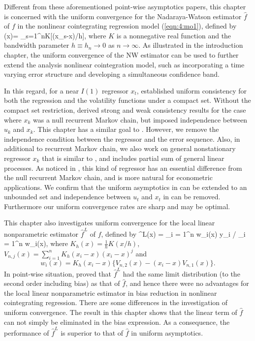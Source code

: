 Different from these aforementioned point-wise asymptotics papers, this chapter is concerned with the uniform convergence for the Nadaraya-Watson estimator $\widehat{f}$ of $f$ in the nonlinear cointegrating
regression model (\ref {eqn:4:mo1}), defined by
\be {}(x)=
{\sum_{s=1}^{n}K[(x_{s}-x)/h]},
\ee
where $K$ is a nonnegative real function and  the bandwidth parameter $h\equiv h_n\to 0$ as $n\to\infty$. As illustrated in the introduction chapter, the uniform convergence of the NW estimator can be used to further extend the analysis nonlinear cointegration model, such as incorporating a time varying error structure and developing a simultaneous confidence band.

In this regard, for a near $I(1)$ regressor $x_t$, \cite{wangwang2012} established uniform consistency for  both the regression and the volatility functions under  a compact set. Without the compact set restriction,  \cite{gaolitjostheim2011} derived strong and weak consistency results for the case where $x_k$ was a null recurrent Markov chain,  but  imposed  independence between $u_k$ and $x_k$. This chapter has a similar goal to \cite{gaolitjostheim2011}. However, we remove the independence condition between the regressor and the error sequence. Also, in additional to recurrent Markov chain, we also work on general nonstationary regressor $x_k$ that is similar to \cite{wangphillips2010a}, and includes partial sum of general linear processes. As noticed in \cite{wangphillips2010a}, this kind of regressor has an essential difference from the null recurrent Markov chain, and is more natural for econometric applications.  We confirm that the uniform asymptotics in \cite{wangwang2012} can be extended to an unbounded set and independence between $u_t$ and $x_t$ in \cite{gaolitjostheim2011} can be removed. Furthermore  our uniform convergence rates are sharp and may be optimal.

This chapter also investigates uniform convergence for the local linear nonparametric estimator $\widehat{f}^L$ of $f$, defined by
\be {}
^L(x) = \sum_{i = 1}^n w_i(x) y_i / \sum_{i = 1}^n w_i(x), \quad
\ee
where $K_h(x) = \frac{1}{h}K(x/h)$, $V_{n, j}(x) =  \sum_{i=1}^n K_h(x_i - x) (x_i - x)^j$
and
$$
w_i(x) = K_h(x_i - x) \{ V_{n,2}(x) - (x_i - x) V_{n,1}(x) \}.
$$
 In point-wise situation, \cite{wangphillips2010b} proved that $\widehat{f}^L$ had the same limit distribution (to the second order including bias) as that of   $\widehat{f}$, and hence there were no advantages  for  the local linear nonparametric  estimator in  bias reduction in nonlinear cointegrating regression. There are some differences in the investigation of  uniform convergence. The result in this chapter shows that the linear term  of $\widehat{f}$ can not simply be eliminated in the bias expression. As a consequence,   the performance of $\widehat{f}^L$ is superior to that of $\widehat{f}$ in uniform asymptotics. 

